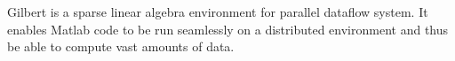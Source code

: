 \clearemptydoublepage
{}
{}

\vspace*{2cm}
\begin{center}
\end{center}
\vspace{1cm}

Gilbert is a sparse linear algebra environment for parallel dataflow system.
It enables Matlab code to be run seamlessly on a distributed environment and thus be able to compute vast amounts of data.